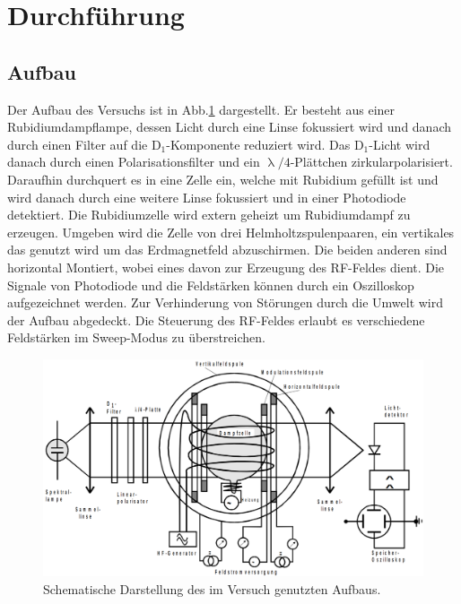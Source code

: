 \section{Durchführung}
\subsection{Aufbau}
Der Aufbau des Versuchs ist in Abb.\ref{aufbau} dargestellt.  Er besteht aus einer Rubidiumdampflampe, dessen Licht durch eine Linse fokussiert wird und danach durch einen Filter auf die D$_1$-Komponente reduziert wird. Das D$_1$-Licht wird danach durch einen Polarisationsfilter und ein $\uplambda/4$-Plättchen zirkularpolarisiert. Daraufhin durchquert es in eine Zelle ein, welche mit Rubidium gefüllt ist und wird danach durch eine weitere Linse fokussiert und in einer Photodiode detektiert. Die Rubidiumzelle wird extern geheizt um Rubidiumdampf zu erzeugen. Umgeben wird die Zelle von drei Helmholtzspulenpaaren, ein vertikales das genutzt wird um das Erdmagnetfeld abzuschirmen. Die beiden anderen sind horizontal Montiert, wobei eines davon zur Erzeugung des RF-Feldes dient. Die Signale von Photodiode und die Feldstärken können durch ein Oszilloskop aufgezeichnet werden. Zur Verhinderung von Störungen durch die Umwelt wird der Aufbau abgedeckt. Die Steuerung des RF-Feldes erlaubt es verschiedene Feldstärken im Sweep-Modus zu überstreichen.
\begin{figure}
  \includegraphics[width=\textwidth]{Bilder/Aufbau}
  \caption{Schematische Darstellung des im Versuch genutzten Aufbaus.\cite{Anleitung}}
  \label{aufbau}
\end{figure}
